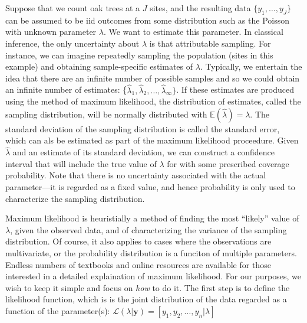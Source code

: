 Suppose that we count oak trees at a
$J$ sites, and the resulting data $\{y_1, \ldots, y_J\}$ can be
assumed to be iid outcomes from some %
distribution such as the Poisson with unknown parameter $\lambda$. We
want to estimate this parameter. %
In classical inference, the only uncertainty about $\lambda$ %
is that attributable
sampling. For instance, we can imagine repeatedly sampling the
population (sites in this example) and obtaining sample-specific estimates of
$\lambda$. Typically, we entertain the idea that there are an infinite
number of possible samples and so we could obtain an infinite
number of estimates: \{$\hat{\lambda}_1, \hat{\lambda}_2, \hdots,
\hat{\lambda}_\infty\}$. If
these estimates are produced using the method of maximum likelihood,
the distribution of estimates, called the sampling distribution, will
be normally distributed with $\mathbb{E}(\hat{\lambda})=\lambda$. The
standard deviation of the sampling distribution is called the standard
error, which can als be estimated as part of the maximum likelihood
proceedure. Given $\hat{\lambda}$ and an estimate of its standard
deviation, we can construct a confidence interval
that will include the true value of $\lambda$ for with some prescribed
coverage probability.
Note that there is
no uncertainty associated with the actual parameter---it is regarded
as a fixed value, and hence probability is only used to characterize
the sampling distribution.

Maximum likelihood is heuristially a method of finding the most ``likely''
value of $\lambda$, given the observed data, and of characterizing the
variance of the sampling distribution. Of course, it also applies to
cases where the observations are multivariate, or the probability
distribution is a funciton of multiple parameters. Endless numbers of
textbooks and online resources are available for those interested in a
detailed explaination of maximum likelihood. For our purposes, we wish
to keep it simple and focus on \textit{how} to do it. The first step
is to define the likelihood function, which is
is the joint distribution of the data regarded as a function of
the parameter(s):
$\mathcal{L}(\lambda | \mathbf{y}) = [y_1, y_2, \dots, y_n | \lambda]$

